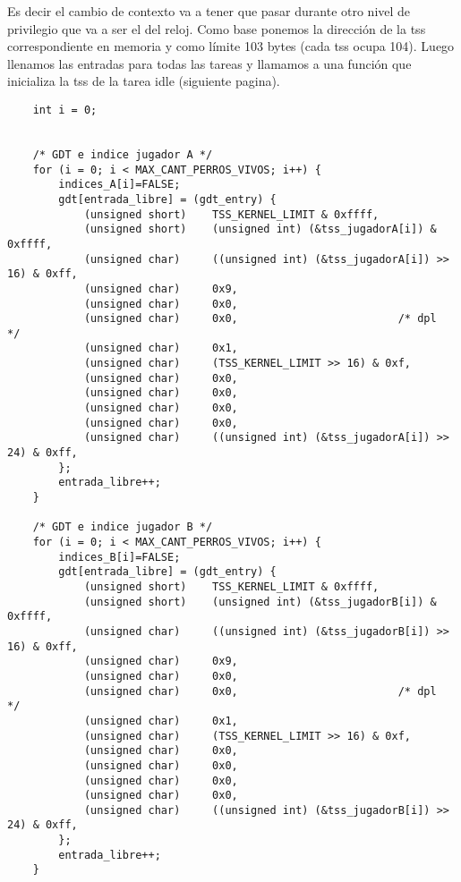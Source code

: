 Es decir el cambio de contexto va a tener que pasar durante otro nivel de privilegio que va a ser el del reloj. Como base ponemos la dirección de la tss correspondiente en memoria y como límite 
103 bytes (cada tss ocupa 104). Luego llenamos las entradas para todas las tareas y llamamos a una función que inicializa la tss de la tarea idle (siguiente pagina).
\begin{codesnippet}
\begin{verbatim}
    int i = 0;


    /* GDT e indice jugador A */
    for (i = 0; i < MAX_CANT_PERROS_VIVOS; i++) {
        indices_A[i]=FALSE;
        gdt[entrada_libre] = (gdt_entry) {
            (unsigned short)    TSS_KERNEL_LIMIT & 0xffff,                          
            (unsigned short)    (unsigned int) (&tss_jugadorA[i]) & 0xffff,         
            (unsigned char)     ((unsigned int) (&tss_jugadorA[i]) >> 16) & 0xff,   
            (unsigned char)     0x9,                                                
            (unsigned char)     0x0,                                                
            (unsigned char)     0x0,                         /* dpl          */
            (unsigned char)     0x1,                                                
            (unsigned char)     (TSS_KERNEL_LIMIT >> 16) & 0xf,                     
            (unsigned char)     0x0,                                                
            (unsigned char)     0x0,                                                
            (unsigned char)     0x0,                                                
            (unsigned char)     0x0,                                                
            (unsigned char)     ((unsigned int) (&tss_jugadorA[i]) >> 24) & 0xff,   
        };
        entrada_libre++;
    }

    /* GDT e indice jugador B */
    for (i = 0; i < MAX_CANT_PERROS_VIVOS; i++) {
        indices_B[i]=FALSE;
        gdt[entrada_libre] = (gdt_entry) {
            (unsigned short)    TSS_KERNEL_LIMIT & 0xffff,                          
            (unsigned short)    (unsigned int) (&tss_jugadorB[i]) & 0xffff,         
            (unsigned char)     ((unsigned int) (&tss_jugadorB[i]) >> 16) & 0xff,   
            (unsigned char)     0x9,                                                
            (unsigned char)     0x0,                                                
            (unsigned char)     0x0,                         /* dpl          */
            (unsigned char)     0x1,                                                
            (unsigned char)     (TSS_KERNEL_LIMIT >> 16) & 0xf,                     
            (unsigned char)     0x0,                                                
            (unsigned char)     0x0,                                                
            (unsigned char)     0x0,                                                
            (unsigned char)     0x0,                                                
            (unsigned char)     ((unsigned int) (&tss_jugadorB[i]) >> 24) & 0xff,   
        };
        entrada_libre++;
    }


\end{verbatim}
\end{codesnippet}
